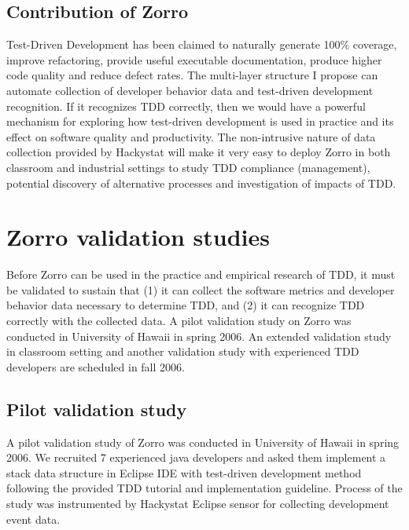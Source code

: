 \subsection{Contribution of Zorro}
Test-Driven Development has been claimed to naturally generate 100\%
coverage, improve refactoring, provide useful executable documentation,
produce higher code quality and reduce defect
rates\cite{Beck:03,George:03,Maximilien:03}. The multi-layer structure I
propose can automate collection of developer behavior data and test-driven
development recognition. If it recognizes TDD correctly, then we would have
a powerful mechanism for exploring how test-driven development is used in
practice and its effect on software quality and productivity. The
non-intrusive nature of data collection provided by Hackystat will make it
very easy to deploy Zorro in both classroom and industrial settings to
study TDD compliance (management), potential discovery of alternative
processes and investigation of impacts of TDD.

\section{Zorro validation studies}
Before Zorro can be used in the practice and empirical research of TDD, it
must be validated to sustain that (1) it can collect the software metrics
and developer behavior data necessary to determine TDD, and (2) it can
recognize TDD correctly with the collected data. A pilot validation study
on Zorro was conducted in University of Hawaii in spring 2006. An extended
validation study in classroom setting and another validation study with
experienced TDD developers are scheduled in fall 2006.

\subsection{Pilot validation study}
A pilot validation study of Zorro was conducted in University of Hawaii in
spring 2006. We recruited 7 experienced java developers and asked them
implement a stack data structure in Eclipse IDE with test-driven
development method following the provided TDD tutorial and implementation
guideline. Process of the study was instrumented by Hackystat Eclipse
sensor for collecting development event data.

